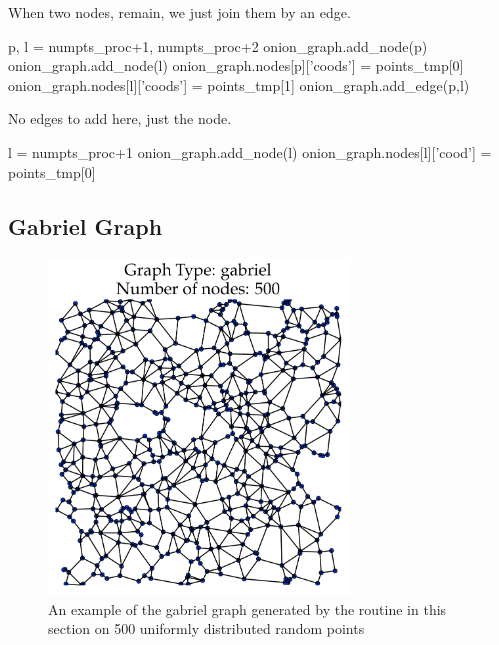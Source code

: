 When two nodes, remain, we just join them by an edge. 

\nwenddocs{}\endmoddef\nwstartdeflinemarkup{}\nwenddeflinemarkup
p, l = numpts_proc+1, numpts_proc+2
onion_graph.add_node(p)
onion_graph.add_node(l)
onion_graph.nodes[p]['coods'] = points_tmp[0]
onion_graph.nodes[l]['coods'] = points_tmp[1]
onion_graph.add_edge(p,l)
\nwendcode{}\nwdocspar

No edges to add here, just the node. 

\nwenddocs{}\endmoddef\nwstartdeflinemarkup{}\nwenddeflinemarkup
l = numpts_proc+1 
onion_graph.add_node(l)
onion_graph.nodes[l]['cood'] = points_tmp[0]
\nwendcode{}\nwdocspar

\subsection{Gabriel Graph}

\begin{figure}[ht]
  \centering
  \includegraphics[width=8cm]{./miscimages/gabriel-graph-example.png}
  \caption{\label{fig:gabriel-example} An example of the gabriel graph generated by the routine in this section on 500 uniformly distributed random points}
\end{figure}



